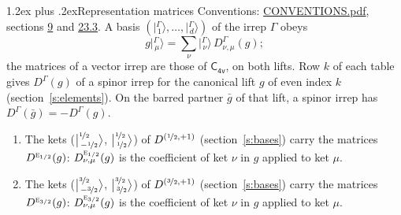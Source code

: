 \documentclass[10pt,a4paper]{article}
\makeatletter
\renewcommand\section{\@startsection{section}{1}{\z@}{-3ex plus -1ex minus -.2ex}%
  {1.2ex plus .2ex}{\normalfont\large\sffamily\bfseries\color{parttitle}}}
\numberwithin{equation}{section}
\newcommand{\grp}[1]{\mathsf{#1}}
\newcommand{\irr}[1]{\text{\normalfont\scshape #1}}
\newcommand{\irrJp}[2]{D^{(#1,#2)}}
\newcommand{\repD}[1]{D^{#1}}
\newcommand{\intx}{\mu}
\newcommand{\jm}[2]{\bigl\lvert{}^{#1}_{\,#2}\bigr\rangle}
\newcommand{\irket}[2]{\bigl\lvert{}^{#1}_{\,#2}\bigr\rangle}
\newcommand{\barred}[1]{\bar{#1}}
\newenvironment{romanlist}{\begin{enumerate}%
\renewcommand{\labelenumi}{(\roman{enumi})}}%
  {\end{enumerate}}
\makeatother
\begin{document}
\section{Representation matrices}\label{s:irrep_matrices}
Conventions: \href{../../CONVENTIONS.pdf}{CONVENTIONS.pdf}, sections \href{../../../rotation/CONVENTIONS.pdf\#conv.9}{9} and \href{../../CONVENTIONS.pdf\#conv.23.3}{23.3}.
\leavevmode\label{n:vector.ket.partner}\label{n:index.partner}\label{n:matrix.irrep}\label{n:index.partner.summed}A basis $(\irket{\Gamma}{1}, \dots, \irket{\Gamma}{d})$ of the irrep $\Gamma$ obeys
\begin{equation}\label{e:partner}g\irket{\Gamma}{\intx} = \sum_\nu \irket{\Gamma}{\nu}\, \repD{\Gamma}_{\nu,\intx}(g);\end{equation}
the matrices of a vector irrep are those of \href{../../../rotation/data/pdf/C4v.pdf}{$\grp{C_{4v}}$}, on both lifts. Row $k$ of each table gives $\repD{\Gamma}(g)$ of a spinor irrep for the canonical lift $g$ of even index $k$ (section~\ref{s:elements}). On the barred partner $\barred{g}$ of that lift, a spinor irrep has $\repD{\Gamma}(\barred{g}) = -\repD{\Gamma}(g)$.
\begin{romanlist}\raggedright
\item The kets ($\jm{\nicefrac{1}{2}}{-\nicefrac{1}{2}}$, $\jm{\nicefrac{1}{2}}{\nicefrac{1}{2}}$) of $\irrJp{\nicefrac{1}{2}}{+1}$ (section~\ref{s:bases}) carry the matrices $\repD{\irr{e}_{1/2}}(g)$: $\repD{\irr{e}_{1/2}}_{\nu,\intx}(g)$ is the coefficient of ket $\nu$ in $g$ applied to ket $\intx$.
\item The kets ($\jm{\nicefrac{3}{2}}{-\nicefrac{3}{2}}$, $\jm{\nicefrac{3}{2}}{\nicefrac{3}{2}}$) of $\irrJp{\nicefrac{3}{2}}{+1}$ (section~\ref{s:bases}) carry the matrices $\repD{\irr{e}_{3/2}}(g)$: $\repD{\irr{e}_{3/2}}_{\nu,\intx}(g)$ is the coefficient of ket $\nu$ in $g$ applied to ket $\intx$.
\end{romanlist}
\end{document}
